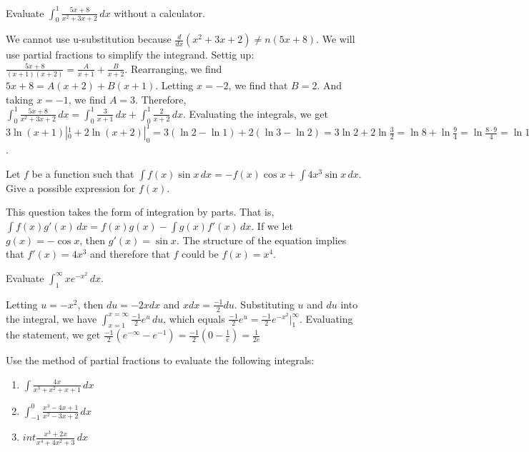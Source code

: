 \begin{Exercise}[label = int_meth2]
	Evaluate $\int_0^1 \frac{5x + 8}{x^2 + 3x + 2}\,dx$ without a 
	calculator. 
\end{Exercise}

\begin{Answer}[ref=int_meth2]
	We cannot use u-substitution because $\frac{d}{dx}(x^2 + 3x + 2) \neq 
	n(5x + 8)$. We will use partial fractions to simplify the integrand. 
	Settig up: $\frac{5x + 8}{(x + 1)(x + 2)} = \frac{A}{x + 1} + 
	\frac{B}{x + 2}$. Rearranging, we find $5x + 8 = A(x + 2) + B(x + 1)$. 
	Letting $x = -2$, we find that $B = 2$. And taking $x = -1$, we find 
	$A = 3$. Therefore, $\int_0^1 \frac{5x + 8}{x^2 + 3x + 2}\,dx = \int
	_0^1 \frac{3}{x + 1}\,dx + \int_0^1 \frac{2}{x + 2}\,dx$. Evaluating 
	the integrals, we get $3\ln{(x + 1)}|_0^1 + 2\ln{(x + 2)}|_0^1 = 3(
	\ln{2} - \ln{1}) + 2(\ln{3} - \ln{2}) = 3\ln{2} + 2\ln{\frac{3}{2}} 
	= \ln{8} + \ln{\frac{9}{4}} = \ln{\frac{8 \cdot 9}{4}} = \ln{18}$. 
\end{Answer}

\begin{Exercise}[label=int_meth3]
Let $f$ be a function such that $\int f(x) \sin{x}\,dx = -f(x)\cos{x} 
+ \int 4x^3 \sin{x}\,dx$. Give a possible expression for $f(x)$. 
\end{Exercise}

\begin{Answer}[ref=int_meth3]
This question takes the form of integration by parts. That is, $\int 
f(x)g'(x)\,dx = f(x)g(x) - \int g(x)f'(x)\,dx$. If we let $g(x) = 
-\cos{x}$, then $g'(x) =\sin{x}$. The structure of the equation 
implies that $f'(x) = 4x^3$ and therefore that $f$ could be $f(x) = 
x^4$. 
\end{Answer}

\begin{Exercise}[label=int_meth4]
Evaluate $\int_1^{\infty}xe^{-x^2}\,dx$. 
\end{Exercise}

\begin{Answer}[ref=int_meth4]
Letting $u = -x^2$, then $du = -2x dx$ and $x dx = \frac{-1}{2}du$. 
Substituting $u$ and $du$ into the integral, we have $\int_{x = 1}^{x 
= \infty} \frac{-1}{2}e^u\,du$, which equals $\frac{-1}{2}e^u = 
\frac{-1}{2}e^{-x^2}|_1^{\infty}$. Evaluating the statement, we get 
$\frac{-1}{2}(e^{-\infty} - e^{-1}) = \frac{-1}{2}(0-\frac{1}{e}) = 
\frac{1}{2e}$
\end{Answer}

\begin{Exercise}[label = partfrac]
Use the method of partial fractions to evaluate the following integrals:
\begin{enumerate}
\item $\int \frac{4x}{x^3 + x^2 + x + 1}\,dx$
\item $\int_{-1}^0 \frac{x^3 - 4x + 1}{x^2 - 3x + 2}\,dx$
\item $int \frac{x^3 + 2x}{x^4 + 4x^2 + 3}\,dx$
\end{enumerate}
\end{Exercise}

